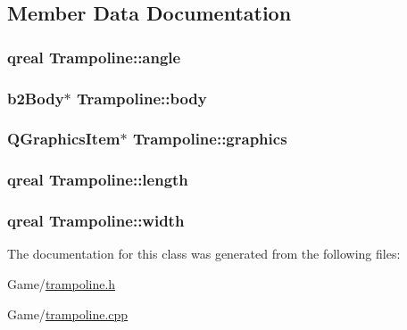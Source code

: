 \subsection{Member Data Documentation}
\subsubsection[{\texorpdfstring{angle}{angle}}]{\setlength{\rightskip}{0pt plus 5cm}qreal Trampoline\+::angle}\hypertarget{class_trampoline_ae2b2f0ba18c591bbcf360f368758edf7}{}\label{class_trampoline_ae2b2f0ba18c591bbcf360f368758edf7}
\subsubsection[{\texorpdfstring{body}{body}}]{\setlength{\rightskip}{0pt plus 5cm}b2\+Body$\ast$ Trampoline\+::body}\hypertarget{class_trampoline_a5640097c2fa1b82b69338e3e3d5fc18e}{}\label{class_trampoline_a5640097c2fa1b82b69338e3e3d5fc18e}
\subsubsection[{\texorpdfstring{graphics}{graphics}}]{\setlength{\rightskip}{0pt plus 5cm}Q\+Graphics\+Item$\ast$ Trampoline\+::graphics}\hypertarget{class_trampoline_a889e4c0143c14b47dc7575395356560a}{}\label{class_trampoline_a889e4c0143c14b47dc7575395356560a}
\subsubsection[{\texorpdfstring{length}{length}}]{\setlength{\rightskip}{0pt plus 5cm}qreal Trampoline\+::length}\hypertarget{class_trampoline_afc20b8e85af09d551c0278b2dcc1d35d}{}\label{class_trampoline_afc20b8e85af09d551c0278b2dcc1d35d}
\subsubsection[{\texorpdfstring{width}{width}}]{\setlength{\rightskip}{0pt plus 5cm}qreal Trampoline\+::width}\hypertarget{class_trampoline_abc6d02536d9caeb1c1d80c545ebae044}{}\label{class_trampoline_abc6d02536d9caeb1c1d80c545ebae044}


The documentation for this class was generated from the following files\+:\begin{DoxyCompactItemize}
\item 
Game/\hyperlink{trampoline_8h}{trampoline.\+h}\item 
Game/\hyperlink{trampoline_8cpp}{trampoline.\+cpp}\end{DoxyCompactItemize}
